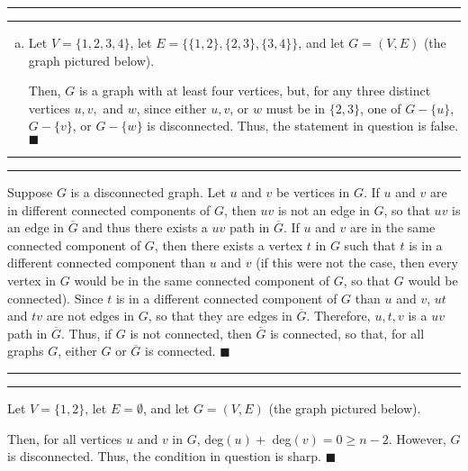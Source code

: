 \documentclass[11pt]{article}
\newcounter{questionCounter}
\newcounter{partCounter}[questionCounter]
\newenvironment{question}[2][\arabic{questionCounter}]{%
    \setcounter{partCounter}{0}%
    \vspace{.25in} \hrule \vspace{0.5em}%
        \noindent{\bf #2}%
    \vspace{0.8em} \hrule \vspace{.10in}%
    \addtocounter{questionCounter}{1}%
}{}
\begin{document}
\begin{question}{Problem 1}
\begin{enumerate}[(a)]
\item Let $V = \{1, 2, 3, 4\}$, let $E = \{\{1, 2\}, \{2, 3\}, \{3, 4\}\}$,
and let $G = (V, E)$ (the graph pictured below).
\begin{center}
\end{center}
Then, $G$ is a graph with at least four vertices, but,
for any three distinct vertices $u, v,$ and $w$, since either $u, v$, or $w$
must be in $\{2, 3\}$, one of $G - \{u\}$, $G - \{v\}$, or $G - \{w\}$ is
disconnected. Thus, the statement in question is false. \qquad $\blacksquare$
\end{enumerate}
\end{question}

\begin{question}{Problem 2} Suppose $G$ is a disconnected graph. Let $u$ and
$v$ be vertices in $G$. If $u$ and $v$ are in different connected components
of $G$, then $uv$ is not an edge in $G$, so that $uv$ is an edge in $\overline{G}$
and thus there exists a $uv$ path in $\overline{G}$. If $u$ and $v$ are in the same
connected component of $G$, then there exists a vertex $t$ in $G$ such that
$t$ is in a different connected component than $u$ and $v$ (if this were not
the case, then every vertex in $G$ would be in the same connected component of
$G$, so that $G$ would be connected). Since $t$ is in a different connected
component of $G$ than $u$ and $v$, $ut$ and $tv$ are not edges in $G$, so that
they are edges in $\overline{G}$. Therefore, $u,t,v$ is a $uv$ path in $\overline{G}$.
Thus, if $G$ is not connected, then $\overline{G}$ is connected, so that, for all
graphs $G$, either $G$ or $\overline{G}$ is connected. \qquad $\blacksquare$
\end{question}

\begin{question}{Problem 3}
Let $V = \{1, 2\}$, let $E = \emptyset$, and let $G = (V, E)$ (the graph
pictured below).
\begin{center}
\end{center}
Then, for all vertices $u$ and $v$ in $G$, deg$(u) +$
deg$(v) = 0 \geq n - 2$. However, $G$ is disconnected. Thus, the condition in
question is sharp. \qquad $\blacksquare$
\end{question}
\end{document}
